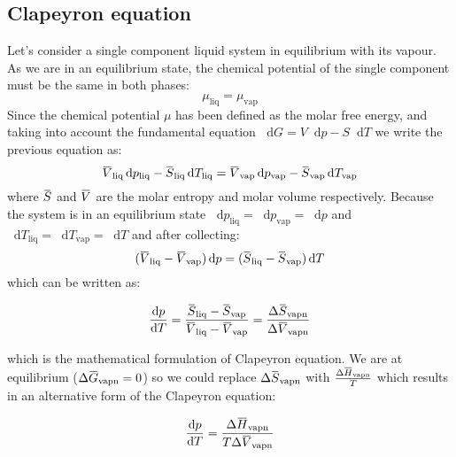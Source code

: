 \documentclass[12pt,a4paper]{report}
\newcommand*\diff{\mathop{}\!\mathrm{d}}
\newcommand{\overbar}[1]{\mkern 1.5mu\overline{\mkern-1.5mu#1\mkern-1.5mu}\mkern 1.5mu}
\newif\ifstudents
\begin{document}
   \subsection*{Clapeyron equation}
   Let's consider a single component liquid system in equilibrium with its vapour. As we are in an equilibrium state, the chemical potential of the single component must be the same in both phases:
   \begin{equation*}
   \mu_{\mathrm{liq}}=\mu_{\mathrm{vap}}
   \end{equation*}
   Since the chemical potential $\mu$ has been defined as the molar free energy, and taking into account the fundamental equation $\diff G= V \diff p-S \diff T$ we write the previous equation as:
   \begin{equation*}
   \overbar{V}_{\mathrm{liq}}\diff p_{\mathrm{liq}} - \overbar{S}_{\mathrm{liq}} \diff T_{\mathrm{liq}} = \overbar{V}_{\mathrm{vap}}\diff p_{\mathrm{vap}} - \overbar{S}_{\mathrm{vap}} \diff T_{\mathrm{vap}} 
   \end{equation*}
   where $\overbar{S}$ and $\overbar{V}$ are the molar entropy and molar volume respectively.
   Because the system is in an equilibrium state $\diff p_{\mathrm{liq}}=\diff p_{\mathrm{vap}} = \diff p$ and $\diff T_{\mathrm{liq}}=\diff T_{\mathrm{vap}} = \diff T$
   and after collecting:
   \begin{equation*}
   (\overbar{V}_{\mathrm{liq}}-\overbar{V}_{\mathrm{vap}}) \diff p = (\overbar{S}_{\mathrm{liq}}-\overbar{S}_{\mathrm{vap}})\diff T
   \end{equation*}
   which can be written as:
   \ifstudents \hideit[2]{ \fi
   \begin{equation*}
   \frac{\diff p}{\diff T}= \frac{\overbar{S}_{\mathrm{liq}}-\overbar{S}_{\mathrm{vap}}}{\overbar{V}_{\mathrm{liq}}-\overbar{V}_{\mathrm{vap}}}= \frac{\Delta \overbar{S}_{\mathrm{vapn}}}{\Delta \overbar{V}_{\mathrm{vapn}}}
   \end{equation*}
   \ifstudents } \fi
   which is the mathematical formulation of Clapeyron equation. We are at equilibrium ($\Delta \overbar{G}_{\mathrm{vapn}} = 0$) so we could replace $\Delta \overbar{S}_{\mathrm{vapn}}$ with $\frac{\Delta \overbar{H}_{\mathrm{vapn}}}{T}$ which results in an alternative form of the Clapeyron equation:
   \ifstudents \hideit[2]{ \fi
   \begin{equation*}
   \frac{\diff p}{\diff T}=  \frac{\Delta \overbar{H}_{\mathrm{vapn}}}{T \Delta \overbar{V}_{\mathrm{vapn}}}
   \end{equation*}
   \ifstudents } \fi
\end{document}
